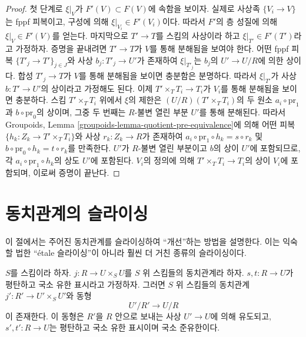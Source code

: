 \begin{proof}
\medskip\noindent
첫 단계로 $\xi|_V$가 $F'(V) \subset F(V)$에 속함을 보이자. 실제로
사상족 $\{V_i \to V\}$는 fppf 피복이고, 구성에 의해
$\xi|_{V_i} \in F'(V_i)$이다. 따라서 $F'$의 층 성질에 의해
$\xi|_V \in F'(V)$를 얻는다. 마지막으로 $T' \to T$를 스킴의 사상이라
하고 $\xi|_{T'} \in F'(T')$라고 가정하자.
증명을 끝내려면 $T' \to T$가 $V$를 통해 분해됨을 보여야 한다.
어떤 fppf 피복 $\{T'_j \to T'\}_{j \in J}$와 사상
$b_j : T'_j \to U'$가 존재하여 $\xi|_{T'_j}$는 $b_j$의
$U' \to U/R$에 의한 상이다. 합성 $T'_j \to T$가 $V$를 통해
분해됨을 보이면 충분함은 분명하다. 따라서 $\xi|_{T'}$가 사상
$b : T' \to U'$의 상이라고 가정해도 된다. 이제
$T'\times_T T_i \to T_i$가 $V_i$를 통해 분해됨을 보이면 충분하다.
스킴 $T' \times_T T_i$ 위에서 $\xi$의 제한은
$(U/R)(T' \times_T T_i)$의 두 원소 $a_i \circ \text{pr}_1$과
$b \circ \text{pr}_0$의 상이며, 그중 두 번째는 $R$-불변 열린 부분
$U'$를 통해 분해된다. 따라서 Groupoids, Lemma
\ref{groupoids-lemma-quotient-pre-equivalence}에 의해 어떤 피복
$\{h_k : Z_k \to T' \times_T T_i\}$와 사상 $r_k : Z_k \to R$가 존재하여
$a_i \circ \text{pr}_1 \circ h_k = s \circ r_k$ 및
$b \circ \text{pr}_0 \circ h_k = t \circ r_k$를 만족한다. $U'$가
$R$-불변 열린 부분이고 $b$의 상이 $U'$에 포함되므로, 각
$a_i \circ \text{pr}_1 \circ h_k$의 상도 $U'$에 포함된다. $V_i$의
정의에 의해 $T' \times_T T_i \to T_i$의 상이 $V_i$에 포함되며,
이로써 증명이 끝난다.
\end{proof}

\section{동치관계의 슬라이싱}
\label{section-slicing}

\noindent
이 절에서는 주어진 동치관계를 슬라이싱하여 ``개선''하는 방법을
설명한다. 이는 익숙할 법한 ``\'etale 슬라이싱''이 아니라 훨씬 더
거친 종류의 슬라이싱이다.


\begin{lemma}
\label{lemma-slice-equivalence-relation}
$S$를 스킴이라 하자.
$j : R \to U \times_S U$를 $S$ 위 스킴들의 동치관계라 하자.
$s, t : R \to U$가 평탄하고 국소 유한 표시라고 가정하자.
그러면 $S$ 위 스킴들의 동치관계 $j' : R' \to U'\times_S U'$와 동형
$$
U'/R' \longrightarrow U/R
$$
이 존재한다. 이 동형은 $R'$을 $R$ 안으로 보내는 사상 $U' \to U$에
의해 유도되고, $s', t' : R \to U$는 평탄하고 국소 유한 표시이며
국소 준유한이다.
\end{lemma}

